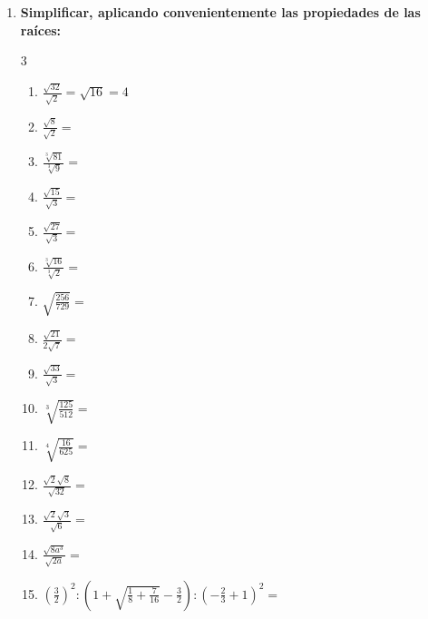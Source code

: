 \documentclass[10pt, a4paper]{article}
\begin{document}
\begin{enumerate}
    \item \textbf{Simplificar, aplicando convenientemente las propiedades de las raíces:}
    \begin{multicol}{3}
    \begin{enumerate}[label=\alph*)]
        \item $\frac{\sqrt{32}}{\sqrt{2}} = \sqrt{16} = 4$
        \item $\frac{\sqrt{8}}{\sqrt{2}} =$
        \item $\frac{\sqrt[3]{81}}{\sqrt[3]{9}} =$
        \item $\frac{\sqrt{15}}{\sqrt{3}} =$
        \item $\frac{\sqrt{27}}{\sqrt{3}} =$
        \item $\frac{\sqrt[3]{16}}{\sqrt[3]{2}} =$
        \item $\sqrt{\frac{256}{729}} =$
        \item $\frac{\sqrt{21}}{2\sqrt{7}} =$
        \item $\frac{\sqrt{33}}{\sqrt{3}} =$
        \item $\sqrt[3]{\frac{125}{512}} =$
        \item $\sqrt[4]{\frac{16}{625}} =$
        \item $\frac{\sqrt{2}\sqrt{8}}{\sqrt{32}} =$
        \item $\frac{\sqrt{2}\sqrt{3}}{\sqrt{6}} =$
        \item $\frac{\sqrt{8a^3}}{\sqrt{2a}} =$
        \item $(\frac{3}{2})^2 : \left(1 + \sqrt{\frac{1}{8} + \frac{7}{16}} - \frac{3}{2}\right) : \left(-\frac{2}{3} + 1\right)^2 =$
    \end{enumerate}
    \end{multicol}


\end{enumerate}
\end{document}
